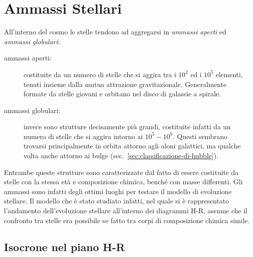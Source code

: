 \section{Ammassi Stellari}
All'interno del cosmo le stelle tendono ad aggregarsi in \emph{ammassi aperti} ed \emph{ammassi globulari}:

\begin{description}
\item[ammassi aperti:]costituite da un numero di stelle che si aggira tra i $10^2$ ed i $10^5$ elementi, tenuti insieme dalla mutua attrazione gravitazionale. Generalmente formate da stelle giovani e orbitano nel disco di galassie a spirale.
\item[ammassi globulari:]invece sono strutture decisamente più grandi, costituite infatti da un numero di stelle che si aggira intorno ai $10^5 - 10^6$. Questi sembrano trovarsi principalmente in orbita attorno agli aloni galattici, ma qualche volta anche attorno ai bulge (sec.~\ref{sec:classificazione-di-hubble}). 
\end{description}

Entrambe queste strutture sono caratterizzate dal fatto di essere costituite da stelle con la stessa età e composizione chimica, benché con masse differenti. Gli ammassi sono infatti degli ottimi luoghi per testare il modello di evoluzione stellare. Il modello che è stato studiato infatti, nel quale si è rappresentato l'andamento dell'evoluzione stellare all'interno dei diagrammi H-R, assume che il confronto tra stelle era possibile se fatto tra corpi di composizione chimica simile.

\begin{center}
\end{center}

\subsection{Isocrone nel piano H-R}\label{sec:isocrone}


